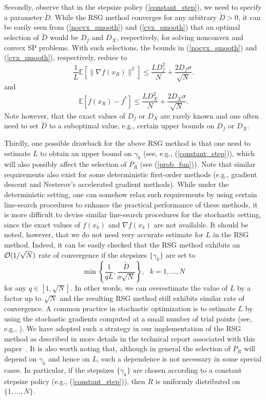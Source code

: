\documentclass[final]{siamltex}
\newcommand{\beq}{\begin{equation}}
\newcommand{\eeq}{\end{equation}}
\def\eqnok#1{(\ref{#1})}
\newcommand{\bbe}{\mathbb{E}}
\begin{document}
Secondly, observe that in the stepsize policy \eqnok{constant_step},
we need to specify a parameter $\tilde D$. While the RSG method converges
for any arbitrary $\tilde D>0$,
it can be easily seen from
\eqnok{nocvx_smooth} and \eqnok{cvx_smooth} that an optimal selection
of $\tilde D$ would be $D_f$ and $D_X$, respectively, for solving
nonconvex and convex SP problems. With such selections, the bounds in \eqnok{nocvx_smooth}
and \eqnok{cvx_smooth}, respectively, reduce to
\beq \label{nocvx_smooth1}
\frac{1}{L} \bbe[\|\nabla f(x_R)\|^2]
\le \frac{L D_f^2}{N} + \frac{2 D_f\sigma}{\sqrt{N}}.
\eeq
and
\beq \label{cvx_smooth1}
\bbe[f(x_R) - f^*] \le \frac{L D_X^2}{N} + \frac{2 D_X \sigma}{\sqrt{N}}.
\eeq
Note however, that the exact values of $D_f$ or $D_X$ are rarely known and
one often need to set $\tilde D$ to a suboptimal value, e.g., certain
upper bounds on $D_f$ or $D_X$.

Thirdly, one possible drawback for the above RSG method is that
one need to estimate $L$ to obtain an upper bound on $\gamma_k$ (see, e.g., \eqnok{constant_step}),
which will also possibly affect the selection of $P_R$ (see \eqnok{prob_fun}). 
Note that similar requirements also exist for some deterministic first-order methods (e.g., gradient descent and
Nesterov's accelerated gradient methods). While under the
deterministic setting, one can somehow relax such requirements
by using certain line-search procedures to enhance the practical performance of these methods,
it is more difficult to devise similar line-search procedures for the stochastic setting, since
the exact values of $f(x_k)$ and $\nabla f(x_k)$ are not available.
It should be noted, however, that we do not need very accurate
estimate for $L$ in the RSG method. Indeed, it can be easily checked that
the RSG method exhibits an ${\cal O}(1/\sqrt{N})$ rate of convergence
if the stepsizes $\{\gamma_k\}$ are set to
\[
\min\left\{\frac{1}{q L}, \frac{\tilde D}{\sigma\sqrt{N}}\right\}, \ \ \ k = 1, \ldots, N
\]
for any $q \in [1, \sqrt{N}]$. In other words, we can overestimate the value of $L$ by
a factor up to $\sqrt{N}$
and the resulting RSG method still exhibits similar rate of convergence.
A common practice in stochastic optimization is to estimate
$L$ by using the stochastic gradients computed at a small number of trial 
points (see, e.g., \cite{NJLS09-1,lns11,GhaLan12-2a,GhaLan10-1b}). 
We have adopted such a strategy in our implementation of the RSG method as described in more details
in the technical report associated with this paper~\cite{GhaLan12}.
It is also worth noting that,
although in general the selection of $P_R$ will depend on $\gamma_k$ and hence on $L$,
such a dependence is not necessary in some special cases.
In particular, if the stepsizes $\{\gamma_k\}$ are chosen according to
a constant stepsize policy (e.g., \eqnok{constant_step}), then $R$ is uniformly distributed on $\{1, \ldots, N\}$.
\end{document}
